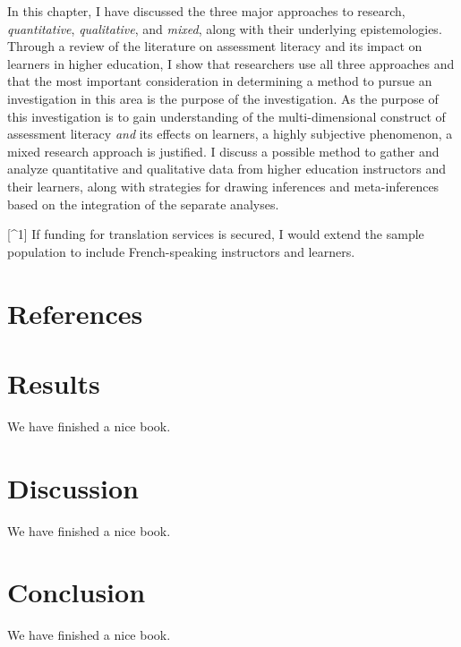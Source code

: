 \documentclass[
]{book}
\begin{document}
In this chapter, I have discussed the three major approaches to research, \emph{quantitative}, \emph{qualitative}, and \emph{mixed}, along with their underlying epistemologies. Through a review of the literature on assessment literacy and its impact on learners in higher education, I show that researchers use all three approaches and that the most important consideration in determining a method to pursue an investigation in this area is the purpose of the investigation. As the purpose of this investigation is to gain understanding of the multi-dimensional construct of assessment literacy \emph{and} its effects on learners, a highly subjective phenomenon, a mixed research approach is justified. I discuss a possible method to gather and analyze quantitative and qualitative data from higher education instructors and their learners, along with strategies for drawing inferences and meta-inferences based on the integration of the separate analyses.

{[}\^{}1{]} If funding for translation services is secured, I would extend the sample population to include French-speaking instructors and learners.

\hypertarget{references}{%
\chapter*{References}\label{references}}

\hypertarget{results}{%
\chapter*{Results}\label{results}}

We have finished a nice book.

\hypertarget{discussion}{%
\chapter*{Discussion}\label{discussion}}

We have finished a nice book.

\hypertarget{conclusion}{%
\chapter*{Conclusion}\label{conclusion}}

We have finished a nice book.
\end{document}
